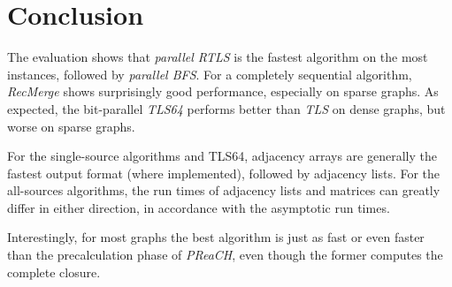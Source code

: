 \documentclass[12pt,a4paper,twoside]{article}
\begin{document}
\section{Conclusion}

The evaluation shows that \emph{parallel RTLS} is the fastest algorithm on the most instances, followed by \emph{parallel BFS}. For a completely sequential algorithm, \emph{RecMerge} shows surprisingly good performance, especially on sparse graphs.  As expected, the bit-parallel \emph{TLS64} performs better than \emph{TLS} on dense graphs, but worse on sparse graphs.

For the single-source algorithms and TLS64, adjacency arrays are generally the fastest output format (where implemented), followed by adjacency lists. For the all-sources algorithms, the run times of adjacency lists and matrices can greatly differ in either direction, in accordance with the asymptotic run times.

Interestingly, for most graphs the best algorithm is just as fast or even faster than the precalculation phase of \emph{PReaCH}, even though the former computes the complete closure.




\end{document}

